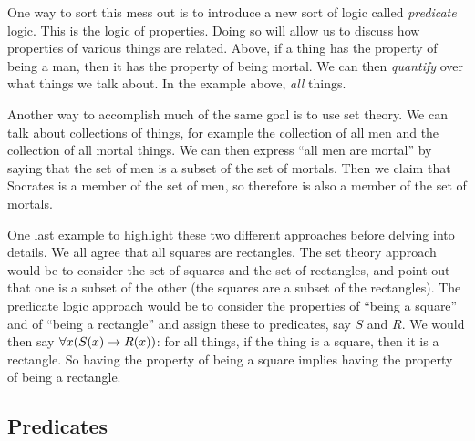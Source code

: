 \documentclass[12pt]{article}
\begin{document}
One way to sort this mess out is to introduce a new sort of logic called {\em predicate} logic.  This is the logic of properties.  Doing so will allow us to discuss how properties of various things are related.  Above, if a thing has the property of being a man, then it has the property of being mortal.  We can then {\em quantify} over what things we talk about.  In the example above, {\em all} things.

Another way to accomplish much of the same goal is to use set theory. We can talk about collections of things, for example the collection of all men and the collection of all mortal things.  We can then express ``all men are mortal'' by saying that the set of men is a subset of the set of mortals.  Then we claim that Socrates is a member of the set of men, so therefore is also a member of the set of mortals.

One last example to highlight these two different approaches before delving into details.  We all agree that all squares are rectangles.  The set theory approach would be to consider the set of squares and the set of rectangles, and point out that one is a subset of the other (the squares are a subset of the rectangles).  The predicate logic approach would be to consider the properties of ``being a square'' and of ``being a rectangle'' and assign these to predicates, say $S$ and $R$.  We would then say $\forall x (S(x) \rightarrow R(x))$: for all things, if the thing is a square, then it is a rectangle.  So having the property of being a square implies having the property of being a rectangle.

%
%
%
%

\subsection{Predicates}
\end{document}
